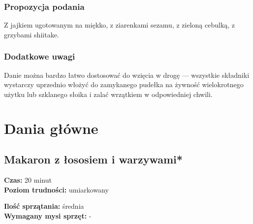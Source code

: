 \documentclass[a4paper,10pt]{book}
\begin{document}
\vspace{0.5cm}

\small \subsection*{Propozycja podania} Z jajkiem ugotowanym na miękko, z ziarenkami sezamu, z zieloną cebulką, z grzybami shiitake.

\vspace{0.3cm}

\subsection*{Dodatkowe uwagi} Danie można bardzo łatwo dostosować do wzięcia w drogę — wszystkie składniki wystarczy uprzednio włożyć do zamykanego pudełka na żywność wielokrotnego użytku lub szklanego słoika i zalać wrzątkiem w odpowiedniej chwili.

\newpage 

\chapter{Dania główne}

\section{Makaron z łososiem i warzywami*}
\bigskip
\small
\begin{minipage}{0.45\textwidth}
    \noindent \textbf{Czas:} 20 minut \\
    \textbf{Poziom trudności:} umiarkowany
\end{minipage}
\begin{minipage}{0.45\textwidth}
    \noindent \textbf{Ilość sprzątania:} średnia\\
    \textbf{Wymagany mysi sprzęt:} -
\end{minipage}
\normalsize
\vspace{0.5cm}
\end{document}
